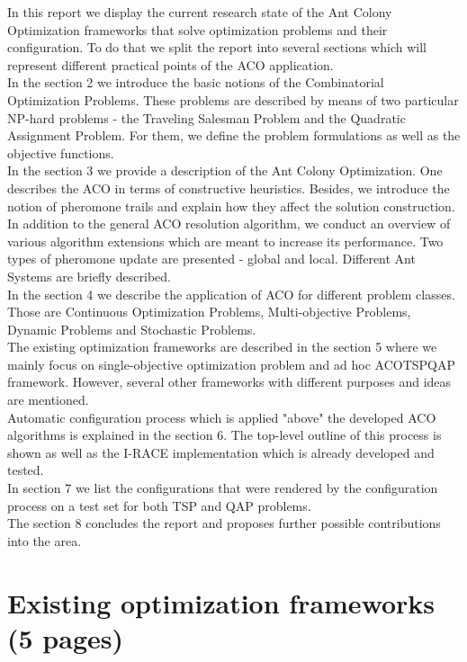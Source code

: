 \documentclass[12pt]{article}
\begin{document}
In this report we display the current research state of the Ant Colony Optimization frameworks that solve optimization problems and their configuration. To do that we split the report into several sections which will represent different practical points of the ACO application. \\
In the section 2 we introduce the basic notions of the Combinatorial Optimization Problems. These problems are described by means of two particular NP-hard problems - the  Traveling Salesman Problem and the Quadratic Assignment Problem. For them, we define the problem formulations as well as the objective functions. \\
In the section 3 we provide a description of the Ant Colony Optimization. One describes the ACO in terms of constructive heuristics. Besides, we introduce the notion of pheromone trails and explain how they affect the solution construction. In addition to the general ACO resolution algorithm, we conduct an overview of various algorithm extensions which are meant to increase its performance. Two types of pheromone update are presented - global and local. Different Ant Systems are briefly described. \\
In the section 4 we describe the application of ACO for different problem classes. Those are Continuous Optimization Problems, Multi-objective Problems, Dynamic Problems and Stochastic Problems. \\
The existing optimization frameworks are described in the section 5 where we mainly focus on single-objective optimization problem and ad hoc ACOTSPQAP framework. However, several other frameworks with different purposes and ideas are mentioned. \\
Automatic configuration process which is applied "above" the developed ACO algorithms is explained in the section 6. The top-level outline of this process is shown as well as the I-RACE implementation which is already developed and tested. \\
In section 7 we list the configurations that were rendered by the configuration process on a test set for both TSP and QAP problems. \\
The section 8 concludes the report and proposes further possible contributions into the area.









\section{Existing optimization frameworks (5 pages)}
\end{document}
